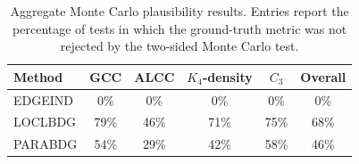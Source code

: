 \begin{table}[t]
\centering
\small
\caption{Aggregate Monte Carlo plausibility results. Entries report the percentage of tests in which the ground-truth metric was not rejected by the two-sided Monte Carlo test.}
\label{tab:aggregate-plausibility}
\begin{tabular}{lccccc}
\toprule
Method & GCC & ALCC & $K_4$-density & $C_3$ & Overall \\
\midrule
EDGEIND & 0\% & 0\% & 0\% & 0\% & 0\% \\
LOCLBDG & 79\% & 46\% & 71\% & 75\% & 68\% \\
PARABDG & 54\% & 29\% & 42\% & 58\% & 46\% \\
\bottomrule
\end{tabular}
\end{table}
